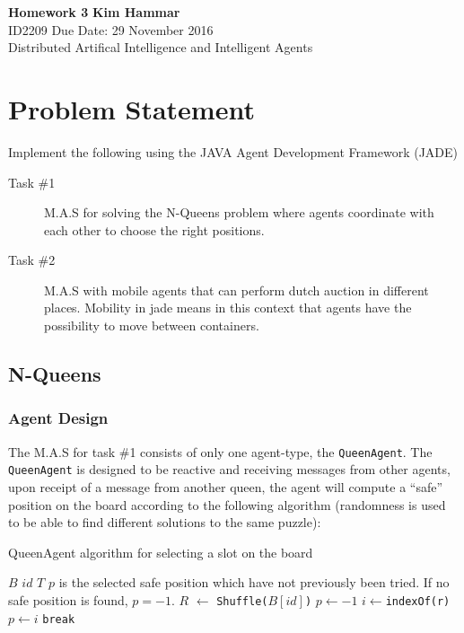 \documentclass[a4paper, 11pt]{article}
\begin{document}
\noindent
\large\textbf{Homework 3} \hfill \textbf{Kim Hammar} \\
\normalsize ID2209 \hfill Due Date: 29 November 2016 \\
Distributed Artifical Intelligence and Intelligent Agents \hfill \\

\section*{Problem Statement}
Implement the following using the JAVA Agent Development Framework (JADE) \citep{jade}
\begin{description}
\item[Task \#1] M.A.S for solving the N-Queens problem where agents coordinate with each other to choose the right positions.
\item[Task \#2] M.A.S with mobile agents that can perform dutch auction in different places. Mobility in jade means in this context that agents have the possibility to move between containers.
\end{description}

\subsection*{N-Queens}
\subsubsection*{Agent Design}
The M.A.S for task \#1 consists of only one agent-type, the \texttt{QueenAgent}. The \texttt{QueenAgent} is designed to be reactive and receiving messages from other agents, upon receipt of a message from another queen, the agent will compute a ``safe'' position on the board according to the following algorithm (randomness is used to be able to find different solutions to the same puzzle):
\begin{algorithm}[H]
\caption{QueenAgent algorithm for selecting a slot on the board}
\label{queen_algo}
\begin{algorithmic}[H]
\Require 
\State $B$ 
\State $id$ 
\State $T$ 
\Ensure 
\State $p$ is the selected safe position which have not previously been tried. If no safe position is found, $p = -1$.
\State
\State $R$  $\leftarrow$ \texttt{Shuffle($B[id]$)} 
\State $p \leftarrow -1$
\State $i \leftarrow $\texttt{indexOf(r)}
\State $p \leftarrow i$
\State \texttt{break}
\EndIf
\EndFor
\EndProcedure
\end{algorithmic}
\end{algorithm}
\end{document}
